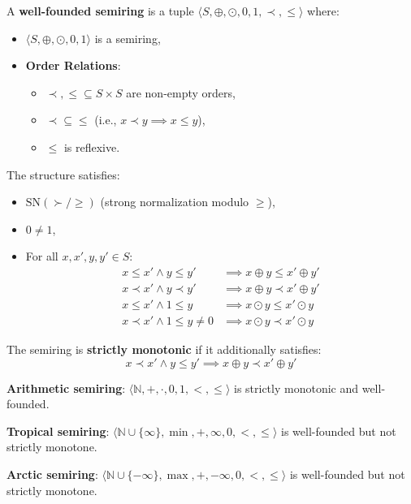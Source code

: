 \begin{definition}
    \label{def:well_founded_semiring}
    A \textbf{well-founded semiring} is a tuple \(\langle S, \oplus, \odot, 0, 1, \prec, \leq \rangle\) where:
    \begin{itemize}
        \item  \(\langle S, \oplus, \odot, 0, 1 \rangle\) is a semiring,
        \item \textbf{Order Relations}: 
            \begin{itemize}
                \item \(\prec, \leq \subseteq S \times S\) are non-empty orders,
                \item \(\prec \subseteq \leq\) (i.e., \(x \prec y \implies x \leq y\)),
                \item \(\leq\) is reflexive.
            \end{itemize}
    \end{itemize}
    The structure satisfies:
    \begin{itemize}
        \item \(\text{SN}(\succ / \geq)\) (strong normalization modulo \(\geq\)),
        \item \(0 \neq 1\),
        \item For all \(x, x', y, y' \in S\):
            \begin{align*}
                x \leq x' \land y \leq y' &\implies x \oplus y \leq x' \oplus y' \tag{S1} \label{ax:S1} \\
                x \prec x' \land y \prec y' &\implies x \oplus y \prec x' \oplus y' \tag{S2} \label{ax:S2} \\
                x \leq x' \land 1 \leq y &\implies x \odot y \leq x' \odot y \tag{S3} \label{ax:S3} \\
                x \prec x' \land 1 \leq y \neq 0 &\implies x \odot y \prec x' \odot y \tag{S4} \label{ax:S4}
            \end{align*}
    \end{itemize}
    The semiring is \textbf{strictly monotonic} if it additionally satisfies:
    \[
        x \prec x' \land y \leq y' \implies x \oplus y \prec x' \oplus y' \tag{S5} \label{ax:S5}
    \]
\end{definition}

\begin{example}
    \label{ex:semiring_examples}
    \textbf{Arithmetic semiring}: \(\langle \mathbb{N}, +, \cdot, 0, 1, <, \leq \rangle\) is strictly monotonic and well-founded.

    \textbf{Tropical semiring}: \(\langle \mathbb{N} \cup \{\infty\}, \min, +, \infty, 0, <, \leq \rangle\) is well-founded but not strictly monotone.

    \textbf{Arctic semiring}: \(\langle \mathbb{N} \cup \{-\infty\}, \max, +, -\infty, 0, <, \leq \rangle\) is well-founded but not strictly monotone.
\end{example}